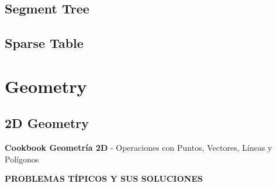 \subsection{Segment Tree}
\subsection{Sparse Table}

\section{Geometry}
\subsection{2D Geometry}
\textbf{Cookbook Geometría 2D} - Operaciones con Puntos, Vectores, Líneas y Polígonos

\vspace{0.3cm}
\textbf{PROBLEMAS TÍPICOS Y SUS SOLUCIONES}

